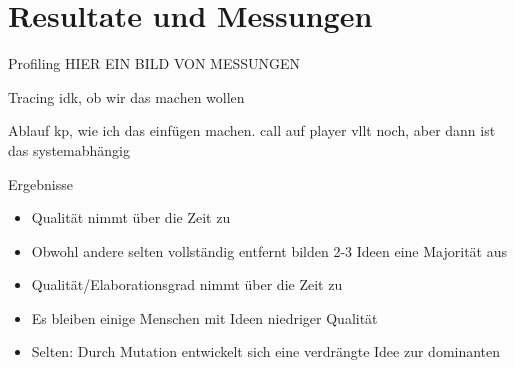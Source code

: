 \section{Resultate und Messungen}
\begin{frame} {Profiling}
	HIER EIN BILD VON MESSUNGEN
\end{frame}

\begin{frame} {Tracing}
	idk, ob wir das machen wollen
\end{frame}

\begin{frame} {Ablauf}
	kp, wie ich das einfügen machen. call auf player vllt noch, aber dann ist das systemabhängig
\end{frame}

\begin{frame} {Ergebnisse}
	\begin{itemize}
		\item Qualität nimmt über die Zeit zu
		\item Obwohl andere selten vollständig entfernt bilden 2-3 Ideen eine Majorität aus
		\item Qualität/Elaborationsgrad nimmt über die Zeit zu
		\item Es bleiben einige Menschen mit Ideen niedriger Qualität
		\item Selten: Durch Mutation entwickelt sich eine verdrängte Idee zur dominanten
	\end{itemize}
\end{frame}
